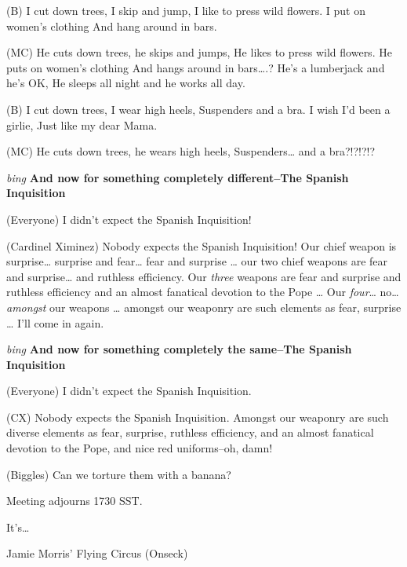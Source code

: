 (B) I cut down trees, I skip and jump,
I like to press wild flowers.
I put on women's clothing
And hang around in bars.

(MC) He cuts down trees, he skips and jumps,
He likes to press wild flowers.
He puts on women's clothing
And hangs around in bars\ldots{}.?
He's a lumberjack and he's OK,
He sleeps all night and he works all day.

(B) I cut down trees, I wear high heels,
Suspenders and a bra.
I wish I'd been a girlie,
Just like my dear Mama.

(MC) He cuts down trees, he wears high heels,
Suspenders\ldots{} and a bra?!?!?!?

\vspace{0.15in}
{\em bing\/} {\bf And now for something completely different--The
Spanish Inquisition\/}

(Everyone) I didn't expect the Spanish Inquisition!

(Cardinel Ximinez) Nobody expects the Spanish Inquisition!  Our chief
weapon is surprise\ldots{} surprise and fear\ldots{} fear and surprise
\ldots{} our two chief weapons are fear and surprise\ldots{} and
ruthless efficiency.  Our {\em three\/} weapons are fear and surprise
and ruthless efficiency and an almost fanatical devotion to the Pope
\ldots{} Our {\em four}\ldots{} no\ldots{}{\em amongst\/} our weapons
\ldots{} amongst our weaponry are such elements as fear, surprise
\ldots{} I'll come in again.

\vspace {0.15in}
{\em bing\/} {\bf And now for something completely the same--The Spanish
Inquisition\/}

(Everyone) I didn't expect the Spanish Inquisition.

(CX) Nobody expects the Spanish Inquisition.  Amongst our weaponry are
such diverse elements as fear, surprise, ruthless efficiency, and
an almost fanatical devotion to the Pope, and nice red uniforms--oh,
damn!

(Biggles) Can we torture them with a banana?

Meeting adjourns 1730 SST.

\vspace{0.15in}
\begin{center}
It's\ldots{}

Jamie Morris' Flying Circus (Onseck)
\end{center}

